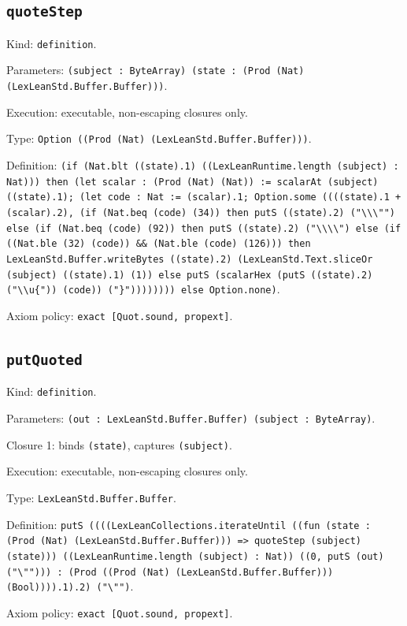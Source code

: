 \documentclass[11pt]{article}
\begin{document}
\subsection*{\texttt{quoteStep}}
\noindent Kind: \texttt{definition}.\par
\noindent Parameters: \texttt{(subject : ByteArray) (state : (Prod (Nat) (LexLeanStd.Buffer.Buffer)))}.\par
\noindent Execution: executable, non-escaping closures only.\par
\noindent Type: \texttt{Option ((Prod (Nat) (LexLeanStd.Buffer.Buffer)))}.\par
\noindent Definition: \texttt{(if (Nat.blt ((state).1) ((LexLeanRuntime.length (subject) : Nat))) then (let scalar : (Prod (Nat) (Nat)) := scalarAt (subject) ((state).1); (let code : Nat := (scalar).1; Option.some ((((state).1 + (scalar).2), (if (Nat.beq (code) (34)) then putS ((state).2) ("\textbackslash{}\textbackslash{}\textbackslash{}"") else (if (Nat.beq (code) (92)) then putS ((state).2) ("\textbackslash{}\textbackslash{}\textbackslash{}\textbackslash{}") else (if ((Nat.ble (32) (code)) \&\& (Nat.ble (code) (126))) then LexLeanStd.Buffer.writeBytes ((state).2) (LexLeanStd.Text.sliceOr (subject) ((state).1) (1)) else putS (scalarHex (putS ((state).2) ("\textbackslash{}\textbackslash{}u\{")) (code)) ("\}")))))))) else Option.none)}.\par
\noindent Axiom policy: \texttt{exact [Quot.sound, propext]}.\par
\subsection*{\texttt{putQuoted}}
\noindent Kind: \texttt{definition}.\par
\noindent Parameters: \texttt{(out : LexLeanStd.Buffer.Buffer) (subject : ByteArray)}.\par
\noindent Closure 1: binds \texttt{(state)}, captures \texttt{(subject)}.\par
\noindent Execution: executable, non-escaping closures only.\par
\noindent Type: \texttt{LexLeanStd.Buffer.Buffer}.\par
\noindent Definition: \texttt{putS ((((LexLeanCollections.iterateUntil ((fun (state : (Prod (Nat) (LexLeanStd.Buffer.Buffer))) => quoteStep (subject) (state))) ((LexLeanRuntime.length (subject) : Nat)) ((0, putS (out) ("\textbackslash{}""))) : (Prod ((Prod (Nat) (LexLeanStd.Buffer.Buffer))) (Bool)))).1).2) ("\textbackslash{}"")}.\par
\noindent Axiom policy: \texttt{exact [Quot.sound, propext]}.\par
\end{document}
